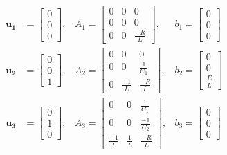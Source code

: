 \noindent
\begin{equation}
    \begin{matrix}
        \mathbf{u_1} &= \left[ \begin{array}{ccc} 0 \\ 0 \\ 0 \end{array} \right],
        &
        A_1 = \left[ \begin{array}{ccc} 
            0 & 0 & 0 \\
            0 & 0 & 0 \\
            0 & 0 & \frac{-R}{L} 
        \end{array} \right],
        &
        b_1 = \left[ \begin{array}{c} 0 \\ 0 \\ 0 \end{array} \right] \\
        \mathbf{u_2} &= \left[ \begin{array}{ccc} 0 \\ 0 \\ 1 \end{array} \right],
        &
        A_2 = \left[ \begin{array}{ccc} 
            0 & 0 & 0 \\
            0 & 0 & \frac{1}{C_1} \\
            0 & \frac{-1}{L} & \frac{-R}{L}
        \end{array} \right],
        &
        b_2 = \left[ \begin{array}{c} 0 \\ 0 \\ \frac{E}{L} \end{array} \right] \\
        \mathbf{u_3} &= \left[ \begin{array}{ccc} 0 \\ 1 \\ 0 \end{array} \right],
        &
        A_3 = \left[ \begin{array}{ccc} 
            0 & 0 & \frac{1}{C_1} \\
            0 & 0 & \frac{-1}{C_2} \\
            \frac{-1}{L} & \frac{1}{L} & \frac{-R}{L}
        \end{array} \right],
        &
        b_3 = \left[ \begin{array}{c} 0 \\ 0 \\ 0 \end{array} \right] \\

\end{matrix}
\end{equation}
